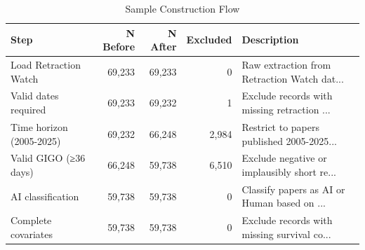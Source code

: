 \begin{table}[htbp]
\centering
\caption{Sample Construction Flow}
\label{tab:sample_flow}
\begin{tabular}{lrrrl}
\toprule
Step & N Before & N After & Excluded & Description \\
\midrule
Load Retraction Watch & 69,233 & 69,233 & 0 & Raw extraction from Retraction Watch dat... \\
Valid dates required & 69,233 & 69,232 & 1 & Exclude records with missing retraction ... \\
Time horizon (2005-2025) & 69,232 & 66,248 & 2,984 & Restrict to papers published 2005-2025... \\
Valid GIGO (≥36 days) & 66,248 & 59,738 & 6,510 & Exclude negative or implausibly short re... \\
AI classification & 59,738 & 59,738 & 0 & Classify papers as AI or Human based on ... \\
Complete covariates & 59,738 & 59,738 & 0 & Exclude records with missing survival co... \\
\bottomrule
\end{tabular}
\end{table}